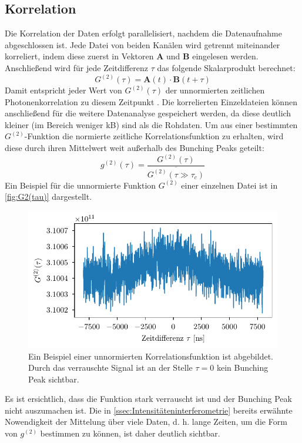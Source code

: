 \subsection{Korrelation}
\label{ssec:Korrelation}
Die Korrelation der Daten erfolgt parallelisiert, nachdem die Datenaufnahme abgeschlossen ist. 
Jede Datei von beiden Kanälen wird getrennt miteinander korreliert, indem diese zuerst in Vektoren $\mathbf{A}$ und $\mathbf{B}$ eingelesen werden. 
Anschließend wird für jede Zeitdifferenz $\tau$ das folgende Skalarprodukt berechnet: 
\begin{equation}
    G^{(2)}(\tau) = \mathbf{A}(t)\cdot\mathbf{B}(t+\tau)
    \label{eq:korrelation}
\end{equation}
Damit entspricht jeder Wert von $G^{(2)}(\tau)$ der unnormierten zeitlichen Photonenkorrelation zu diesem Zeitpunkt \cite{zmijaOpticalIntensityInterferometry2021}. 
Die korrelierten Einzeldateien können anschließend für die weitere Datenanalyse gespeichert werden, da diese deutlich kleiner (im Bereich weniger kB) sind als die Rohdaten. 
Um aus einer bestimmten $G^{(2)}$-Funktion die normierte zeitliche Korrelationsfunktion zu erhalten, wird diese durch ihren Mittelwert weit außerhalb des Bunching Peaks geteilt:
\begin{equation}
    g^{(2)}(\tau) = \frac{G^{(2)}(\tau)}{\overline{G^{(2)}(\tau\gg\tau_c)}}
    \label{eq:G2 normalisierung}
\end{equation}
Ein Beispiel für die unnormierte Funktion $G^{(2)}$ einer einzelnen Datei ist in \autoref{fig:G2(tau)} dargestellt. 
\begin{figure}[h]
    \centering
    \includegraphics{images/Datenaufnahme/G2.pdf}
    \caption{Ein Beispiel einer unnormierten Korrelationsfunktion ist abgebildet. Durch das verrauschte Signal ist an der Stelle $\tau=0$ kein Bunching Peak sichtbar.}
    \label{fig:G2(tau)}
\end{figure}
Es ist ersichtlich, dass die Funktion stark verrauscht ist und der Bunching Peak nicht auszumachen ist. 
Die in \autoref{ssec:Intensitäteninterferometrie} bereits erwähnte Nowendigkeit der Mittelung über viele Daten, d. h. lange Zeiten, um die Form von $g^{(2)}$ bestimmen zu können, ist daher deutlich sichtbar. 


